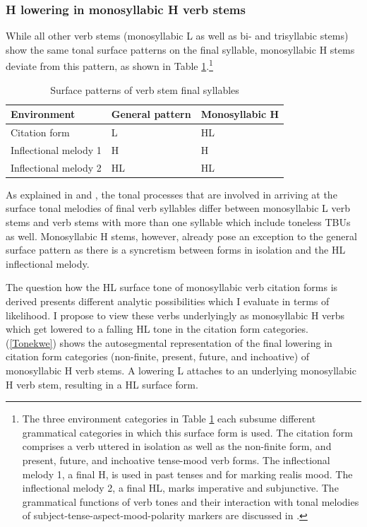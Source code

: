 \subsubsection{H lowering in monosyllabic H verb stems}
\label{sec:ToneLower}

While all other verb stems (monosyllabic L as well as bi- and trisyllabic stems) show the same tonal surface patterns on the final syllable, monosyllabic H stems deviate from this pattern, as shown in Table \ref{Tab:Vpattsurf}.\footnote{The three environment categories in Table \ref{Tab:Vpattsurf} each subsume different grammatical categories in which this surface form is used. The citation form comprises a verb uttered in isolation as well as the non-finite form, and present, future, and inchoative tense-mood verb forms. The inflectional melody 1, a final H, is used in past tenses and for marking realis mood. The inflectional melody 2, a final HL, marks imperative and subjunctive. The grammatical functions of verb tones and their interaction with tonal melodies of subject-tense-aspect-mood-polarity markers are discussed in .}


\begin{table} 
\centering
\begin{tabular}{l|ll}
Environment  			& 	General pattern		& Monosyllabic H \\
 \midrule
Citation form 			& 	L 				&  HL		\\
Inflectional melody 1		& 	H 				& H 			\\
Inflectional melody 2 	& 	HL 				& HL 		\\
 \midrule
\end{tabular}
\caption{Surface patterns of verb stem final syllables}
\label{Tab:Vpattsurf}
\end{table}



As explained in  and , the tonal processes that are involved in arriving at the surface tonal melodies of final verb syllables differ between monosyllabic L verb stems and verb stems with more than one syllable which include toneless TBUs as well. Monosyllabic H stems, however, already pose an exception to the general surface pattern as there is a syncretism between forms in isolation and the HL inflectional melody.

The question how the HL surface tone of monosyllabic verb citation forms is derived presents different analytic possibilities which I evaluate in terms of likelihood. I propose to view these verbs underlyingly as monosyllabic H verbs which get lowered to a falling HL tone in the citation form categories.
(\ref{Tonekwe}) shows the autosegmental representation of the final lowering in citation form categories (non-finite, present, future, and inchoative) of monosyllabic H verb stems. A lowering L attaches to an underlying monosyllabic H verb stem, resulting in a HL surface form.


